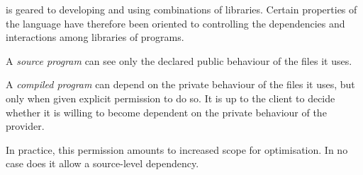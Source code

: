 \asharp{} is geared to developing and using combinations of libraries.
Certain properties of the language have therefore been oriented
to controlling the dependencies and interactions among libraries of programs.

A {\em source program} can see only the declared public behaviour
of the files it uses.

A {\em compiled program} can depend on the private behaviour of the
files it uses, but only when given explicit permission to do so.
It is up to the client to decide
whether it is willing to become dependent on
the private behaviour of the provider.

In practice, this permission amounts to increased scope
for optimisation.
In no case does it allow a source-level dependency.
